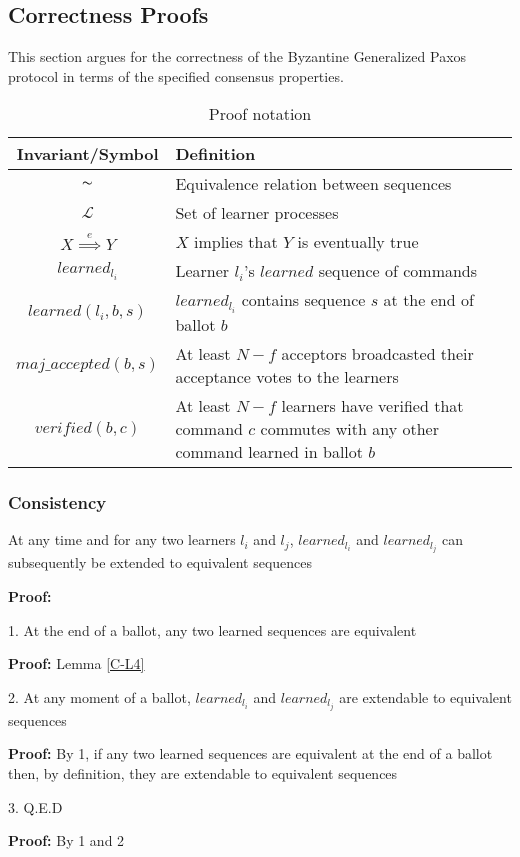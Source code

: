 \subsection{Correctness Proofs}

This section argues for the correctness of the Byzantine Generalized Paxos protocol in terms of the specified consensus properties.\par


\begin{table}[h!]
	\renewcommand{\arraystretch}{1.5}
	\centering
	\begin{tabularx}{\linewidth}{ |c|X|}
		\hline
		Invariant/Symbol & Definition \\
		\hline
		$\thicksim$ & Equivalence relation between sequences \\
		\hline
		$\mathcal{L}$ & Set of learner processes \\
		\hline
		$X \overset{e}{\implies} Y$ & $X$ implies that $Y$ is eventually true \\
		\hline
		$learned_{l_i}$ & Learner $l_i$'s $learned$ sequence of commands \\
		\hline
		$learned(l_i,b,s)$ & $learned_{l_i}$ contains sequence $s$ at the end of ballot $b$  \\
		\hline
		$maj\_accepted(b,s)$ & At least $N-f$ acceptors broadcasted their acceptance votes to the learners\\
		\hline
		$verified(b,c)$ & At least $N-f$ learners have verified that command $c$ commutes with any other command learned in ballot $b$\\
		\hline
	\end{tabularx} 
	\caption{Proof notation} 
	\label{table:1}
\end{table}

\subsubsection{Consistency}
\begin{theorem}
At any time and for any two learners $l_i$ and $l_j$, $learned_{l_i}$ and $learned_{l_j}$ can subsequently be extended to equivalent sequences \label{C-T1}
\end{theorem} 
\textbf{Proof:} \par
1. At the end of a ballot, any two learned sequences are equivalent \par
\indent\indent\textbf{Proof:} Lemma \ref{C-L4} \par
2. At any moment of a ballot, $learned_{l_i}$ and $learned_{l_j}$ are extendable to equivalent sequences \par
\indent\indent\textbf{Proof:} By 1, if any two learned sequences are equivalent at the end of a ballot then, by definition, they are extendable to equivalent sequences\par
3. Q.E.D \par
\indent\indent\textbf{Proof:} By 1 and 2\par


